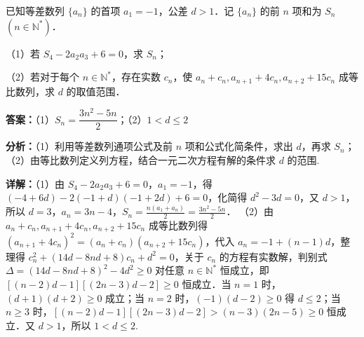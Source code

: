 \begin{question}[points=15]
已知等差数列 $\{a_n\}$ 的首项 $a_1 = -1$，公差 $d > 1$．记 $\{a_n\}$ 的前 $n$ 项和为 $S_n$ $(n \in \mathbb{N}^*)$．

（1）若 $S_4 - 2a_2 a_3 + 6 = 0$，求 $S_n$；

（2）若对于每个 $n \in \mathbb{N}^*$，存在实数 $c_n$，使 $a_n + c_n, a_{n+1} + 4c_n, a_{n+2} + 15c_n$ 成等比数列，求 $d$ 的取值范围．
\begin{solution}
\textbf{答案：}（1）$S_n = \dfrac{3n^2-5n}{2}$；（2）$1<d\le 2$

\textbf{分析：}（1）利用等差数列通项公式及前 $n$ 项和公式化简条件，求出 $d$，再求 $S_n$；（2）由等比数列定义列方程，结合一元二次方程有解的条件求 $d$ 的范围.

\textbf{详解：}（1）由 $S_4 - 2a_2a_3+6=0$，$a_1=-1$，得 $(-4+6d) - 2(-1+d)(-1+2d)+6=0$，化简得 $d^2-3d=0$，又 $d>1$，所以 $d=3$，$a_n=3n-4$，$S_n = \frac{n(a_1+a_n)}{2} = \frac{3n^2-5n}{2}$．
（2）由 $a_n+c_n, a_{n+1}+4c_n, a_{n+2}+15c_n$ 成等比数列得 $(a_{n+1}+4c_n)^2 = (a_n+c_n)(a_{n+2}+15c_n)$，代入 $a_n=-1+(n-1)d$，整理得 $c_n^2 + (14d-8nd+8)c_n + d^2 = 0$，关于 $c_n$ 的方程有实数解，判别式 $\Delta = (14d-8nd+8)^2 - 4d^2 \ge 0$ 对任意 $n\in\mathbb{N}^*$ 恒成立，即 $[(n-2)d-1][(2n-3)d-2] \ge 0$ 恒成立．当 $n=1$ 时，$(d+1)(d+2)\ge0$ 成立；当 $n=2$ 时，$(-1)(d-2)\ge0$ 得 $d\le2$；当 $n\ge3$ 时，$[(n-2)d-1][(2n-3)d-2] > (n-3)(2n-5) \ge 0$ 恒成立．又 $d>1$，所以 $1<d\le2$.
\end{solution}
\end{question}

